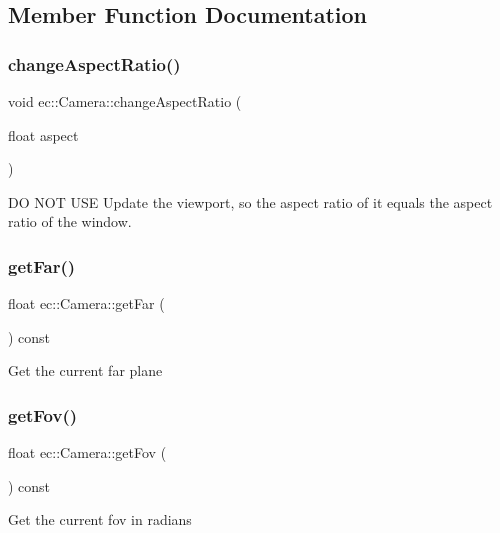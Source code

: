 \subsection{Member Function Documentation}
\mbox{\label{classec_1_1_camera_ae66d4600de35284b8c6846e3dbd9c12d}} 
\subsubsection{\texorpdfstring{change\+Aspect\+Ratio()}{changeAspectRatio()}}
{\footnotesize\ttfamily void ec\+::\+Camera\+::change\+Aspect\+Ratio (\begin{DoxyParamCaption}\item[{float}]{aspect }\end{DoxyParamCaption})}

DO N\+OT U\+SE Update the viewport, so the aspect ratio of it equals the aspect ratio of the window. \mbox{\label{classec_1_1_camera_a6555d47e1c17caf67cf8683b4cbaca4b}} 
\subsubsection{\texorpdfstring{get\+Far()}{getFar()}}
{\footnotesize\ttfamily float ec\+::\+Camera\+::get\+Far (\begin{DoxyParamCaption}{ }\end{DoxyParamCaption}) const}

Get the current far plane \mbox{\label{classec_1_1_camera_a741cb88974dfd00492315ccf613e8539}} 
\subsubsection{\texorpdfstring{get\+Fov()}{getFov()}}
{\footnotesize\ttfamily float ec\+::\+Camera\+::get\+Fov (\begin{DoxyParamCaption}{ }\end{DoxyParamCaption}) const}

Get the current fov in radians \mbox{\label{classec_1_1_camera_a96f6414127f336eb9079ad30df80d1a7}} 
